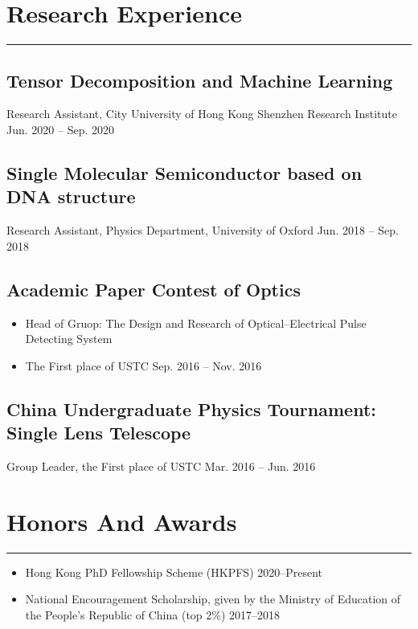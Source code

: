 \documentclass{article}
\newcommand{\cussection}[1]{\vspace{--0.05in}\section*{#1}\vspace{--0.1in} \hrule\vspace{0.2in} }
\begin{document}
\cussection{Research Experience}

\subsection*{Tensor Decomposition and Machine Learning}
Research Assistant, City University of Hong Kong Shenzhen Research Institute \hfill Jun. 2020 -- Sep. 2020

\subsection*{Single Molecular Semiconductor based on DNA structure}
Research Assistant, Physics Department, University of Oxford \hfill Jun. 2018 -- Sep. 2018

\subsection*{Academic Paper Contest of Optics}
\begin{itemize}
    \item Head of Gruop: The Design and Research of Optical--Electrical Pulse Detecting System
    \item The First place of USTC \hfill Sep. 2016 -- Nov. 2016
\end{itemize}

\subsection*{China Undergraduate Physics Tournament: Single Lens Telescope}
Group Leader, the First place of USTC \hfill Mar. 2016 -- Jun. 2016


\cussection{Honors And Awards}



\begin{itemize}
    \item Hong Kong PhD Fellowship Scheme (HKPFS) \hfill 2020--Present
    \item National Encouragement Scholarship, given by the Ministry of Education of the People’s Republic
    of China (top 2\%) \hfill 2017--2018
\end{itemize}

\end{document}

